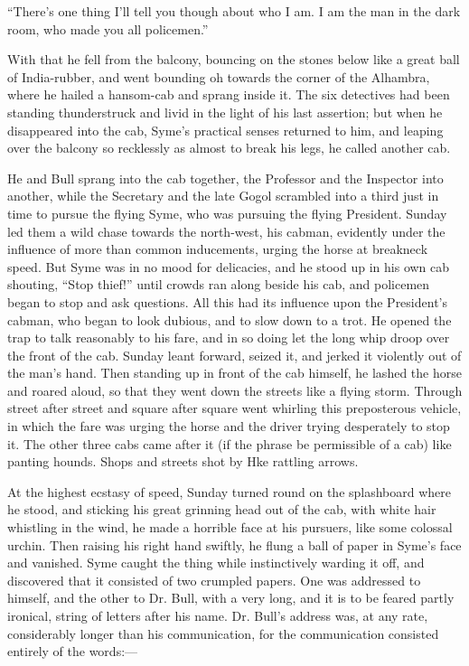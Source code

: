 \documentclass{book}
\begin{document}
“There’s one thing I’ll tell you though about who I am. I am the man in the dark room, who made you all policemen.”

With that he fell from the balcony, bouncing on the stones below like a great ball of India-rubber, and went bounding oh towards the corner of the Alhambra, where he hailed a hansom-cab and sprang inside it. The six detectives had been standing thunderstruck and livid in the light of his last assertion; but when he disappeared into the cab, Syme’s practical senses returned to him, and leaping over the balcony so recklessly as almost to break his legs, he called another cab.

He and Bull sprang into the cab together, the Professor and the Inspector into another, while the Secretary and the late Gogol scrambled into a third just in time to pursue the flying Syme, who was pursuing the flying President. Sunday led them a wild chase towards the north-west, his cabman, evidently under the influence of more than common inducements, urging the horse at breakneck speed. But Syme was in no mood for delicacies, and he stood up in his own cab shouting, “Stop thief!” until crowds ran along beside his cab, and policemen began to stop and ask questions. All this had its influence upon the President’s cabman, who began to look dubious, and to slow down to a trot. He opened the trap to talk reasonably to his fare, and in so doing let the long whip droop over the front of the cab. Sunday leant forward, seized it, and jerked it violently out of the man’s hand. Then standing up in front of the cab himself, he lashed the horse and roared aloud, so that they went down the streets like a flying storm. Through street after street and square after square went whirling this preposterous vehicle, in which the fare was urging the horse and the driver trying desperately to stop it. The other three cabs came after it (if the phrase be permissible of a cab) like panting hounds. Shops and streets shot by Hke rattling arrows.

At the highest ecstasy of speed, Sunday turned round on the splashboard where he stood, and sticking his great grinning head out of the cab, with white hair whistling in the wind, he made a horrible face at his pursuers, like some colossal urchin. Then raising his right hand swiftly, he flung a ball of paper in Syme’s face and vanished. Syme caught the thing while instinctively warding it off, and discovered that it consisted of two crumpled papers. One was addressed to himself, and the other to Dr. Bull, with a very long, and it is to be feared partly ironical, string of letters after his name. Dr. Bull’s address was, at any rate, considerably longer than his communication, for the communication consisted entirely of the words:—
\end{document}
